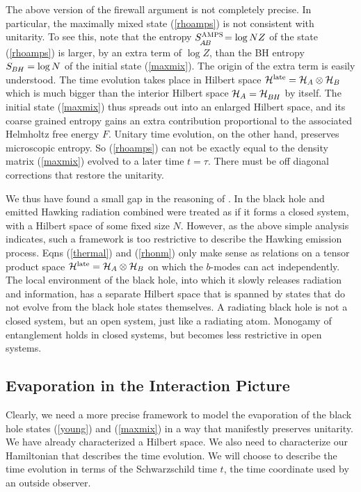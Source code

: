 \documentclass[12pt]{article}%
\begin{document}
The above version of the firewall argument is not completely precise. In particular, the maximally mixed state (\ref{rhoamps}) is
not consistent with unitarity.  To see this, note that the  entropy $S^{\mbox{\scriptsize \sc AMPS}}_\abAB\! = \log NZ$ of the 
state (\ref{rhoamps}) is larger, by an extra term of $\log Z$, than the BH entropy $S_\BH 
= \log N$ of the initial state (\ref{maxmix}). The origin of the extra term is easily understood. The time evolution takes place in 
Hilbert space ${\cal H}^{\rm late} = {\cal H}_A \otimes {\cal H}_B$ which  is much bigger than the interior Hilbert space ${\cal H}_A = {\cal H}_\BH$ by itself.
The initial state (\ref{maxmix}) thus spreads out into an enlarged Hilbert space, and its coarse grained entropy gains an extra contribution proportional to the 
associated Helmholtz free energy $F$.
Unitary time evolution, on the other hand, preserves microscopic entropy. So (\ref{rhoamps}) can not be exactly equal to  
the density matrix  (\ref{maxmix}) evolved to a later time $t= \tau$. There must be off diagonal corrections that restore the unitarity.

We thus have found a small gap in the reasoning of \cite{amps}. In \cite{amps} the black hole and emitted Hawking radiation combined were treated as if
it forms a closed system, with a Hilbert space of some fixed size $N$. However, as the above simple analysis indicates, such a framework is too  restrictive to describe the Hawking emission process. Eqns (\ref{thermal}) and (\ref{rhonm}) only make sense as relations on a tensor product space ${\cal H}^{\rm late} = {\cal H}_{A} \otimes {\cal H}_{B}$ on which the $b$-modes can act independently.  The local environment of the black hole, into which it slowly releases radiation and information, has a separate Hilbert space that is spanned by states that do not evolve from the black hole states themselves. A radiating black hole is not a closed system, but an open system, just like a radiating atom.
Monogamy of entanglement holds in closed systems, but becomes less restrictive in open systems. 







\subsection{Evaporation in the Interaction Picture}

Clearly, we need a more precise framework to model the evaporation of the black hole states (\ref{young}) and (\ref{maxmix}) in a way that 
manifestly preserves unitarity. We have already characterized a Hilbert space. We also need to characterize our Hamiltonian that describes the time evolution.
We will choose to describe the time evolution in terms of the Schwarzschild time $t$, the time coordinate used by an outside observer.  
\end{document}

